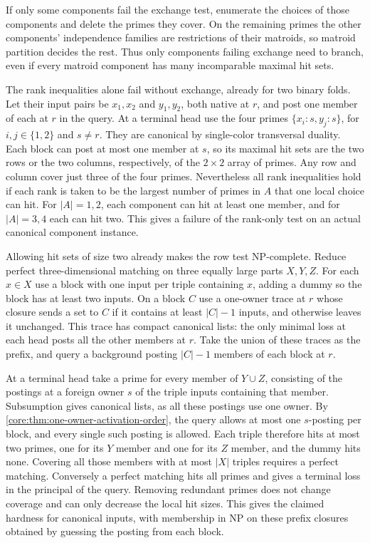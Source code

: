 If only some components fail the exchange test, enumerate
the choices of those components and delete the primes
they cover. On the remaining primes the other components'
independence families are restrictions of their matroids,
so matroid partition decides the rest. Thus only components
failing exchange need to branch, even if every matroid
component has many incomparable maximal hit sets.

The rank inequalities alone fail without exchange, already
for two binary folds. Let their input pairs be $x_1,x_2$
and $y_1,y_2$, both native at $r$, and post one member
of each at $r$ in the query. At a terminal head use the
four primes $\{x_i:s,y_j:s\}$, for $i,j\in\{1,2\}$
and $s\ne r$. They are canonical by single-color
transversal duality. Each block can post at most one member
at $s$, so its maximal hit sets are the two rows or the
two columns, respectively, of the $2\times2$ array of
primes. Any row and column cover just three of the four
primes. Nevertheless all rank inequalities hold if each
rank is taken to be the largest number of primes in $A$
that one local choice can hit. For $|A|=1,2$, each
component can hit at least one member, and for $|A|=3,4$
each can hit two. This gives a failure of the rank-only
test on an actual canonical component instance.

Allowing hit sets of size two already makes the row test
NP-complete. Reduce perfect three-dimensional matching
on three equally large parts $X,Y,Z$. For each $x\in X$
use a block with one input per triple containing $x$,
adding a dummy so the block has at least two inputs.
On a block $C$ use a one-owner trace at $r$ whose closure
sends a set to $C$ if it contains at least $|C|-1$ inputs,
and otherwise leaves it unchanged. This trace has compact
canonical lists: the only minimal loss at each head posts
all the other members at $r$. Take the union of these
traces as the prefix, and query a background posting
$|C|-1$ members of each block at $r$.

At a terminal head take a prime for every member of
$Y\cup Z$, consisting of the postings at a foreign owner
$s$ of the triple inputs containing that member. Subsumption
gives canonical lists, as all these postings use one owner.
By \cref{core:thm:one-owner-activation-order}, the query
allows at most one $s$-posting per block, and every single
such posting is allowed. Each triple therefore hits at most
two primes, one for its $Y$ member and one for its $Z$
member, and the dummy hits none. Covering all those members
with at most $|X|$ triples requires a perfect matching.
Conversely a perfect matching hits all primes and gives
a terminal loss in the principal of the query. Removing
redundant primes does not change coverage and can only
decrease the local hit sizes. This gives the claimed
hardness for canonical inputs, with membership in NP
on these prefix closures obtained by guessing the posting
from each block.

